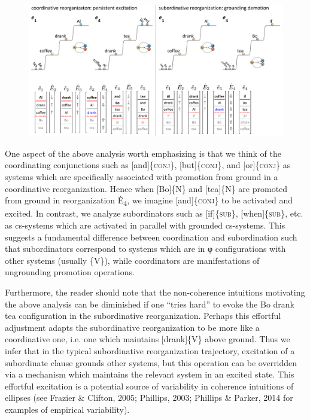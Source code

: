   
\begin{figure}
\includegraphics[width=\textwidth]{figures/Tilsen-img146.png}
\caption{\missingcaption}
\label{fig:}
\end{figure}
 

  One aspect of the above analysis worth emphasizing is that we think of the coordinating conjunctions such as [and]\{\textsc{conj}\}, [but]\{\textsc{conj}\}, and [or]\{\textsc{conj}\} as systems which are specifically associated with promotion from ground in a coordinative reorganization. Hence when [Bo]\{N\} and [tea]\{N\} are promoted from ground in reorganization Ê\textsubscript{4}, we imagine [and]\{\textsc{conj}\} to be activated and excited. In contrast, we analyze subordinators such as [if]\{\textsc{sub}\}, [when]\{\textsc{sub}\}, etc. as cs-systems which are activated in parallel with grounded cs-systems. This suggests a fundamental difference between coordination and subordination such that subordinators correspond to systems which are in φ configurations with other systems (usually \{V\}), while coordinators are manifestations of ungrounding promotion operations.

  Furthermore, the reader should note that the non-coherence intuitions motivating the above analysis can be diminished if one “tries hard” to evoke the {\textbar}Bo drank tea{\textbar} configuration in the subordinative reorganization. Perhaps this effortful adjustment adapts the subordinative reorganization to be more like a coordinative one, i.e. one which maintains [drank]\{V\} above ground. Thus we infer that in the typical subordinative reorganization trajectory, excitation of a subordinate clause grounds other systems, but this operation can be overridden via a mechanism which maintains the relevant system in an excited state. This effortful excitation is a potential source of variability in coherence intuitions of ellipses (see Frazier \& Clifton, 2005; Phillips, 2003; Phillips \& Parker, 2014 for examples of empirical variability). 

